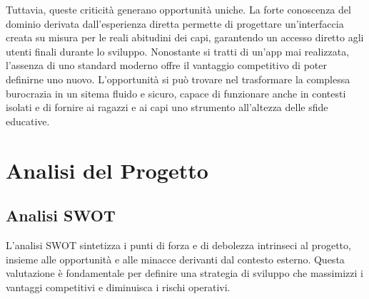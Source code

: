 \documentclass[11pt]{article}
\begin{document}
Tuttavia, queste criticità generano opportunità uniche. La forte conoscenza del dominio derivata dall'esperienza diretta permette di progettare un'interfaccia creata su misura per le reali abitudini dei capi, garantendo un accesso diretto agli utenti finali durante lo sviluppo. Nonostante si tratti di un'app mai realizzata, l'assenza di uno standard moderno offre il vantaggio competitivo di poter definirne uno nuovo. L'opportunità si può trovare nel trasformare la complessa burocrazia in un sitema fluido e sicuro, capace di funzionare anche in contesti isolati e di fornire ai ragazzi e ai capi uno strumento all'altezza delle sfide educative.

\newpage
\section{Analisi del Progetto}
\subsection{Analisi SWOT}
L'analisi SWOT sintetizza i punti di forza e di debolezza intrinseci al progetto, insieme alle opportunità e alle minacce derivanti dal contesto esterno. Questa valutazione è fondamentale per definire una strategia di sviluppo che massimizzi i vantaggi competitivi e diminuisca i rischi operativi.
\end{document}
